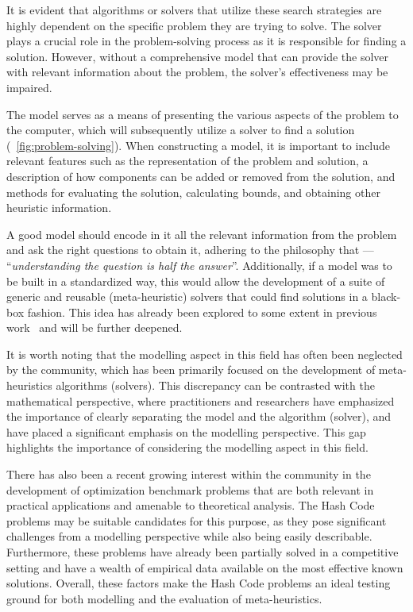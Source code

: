 It is evident that algorithms or solvers that utilize these search strategies
are highly dependent on the specific problem they are trying to solve.  The
solver plays a crucial role in the problem-solving process as it is responsible
for finding a solution. However, without a comprehensive model that can provide
the solver with relevant information about the problem, the solver's
effectiveness may be impaired.

The model serves as a means of presenting the various aspects of the problem to
the computer, which will subsequently utilize a solver to find a
solution (~\ref{fig:problem-solving}).  When constructing a model, it is important
to include relevant features such as the representation of the problem and
solution, a description of how components can be added or removed from the
solution, and methods for evaluating the solution, calculating bounds, and
obtaining other heuristic information.

A good model should encode in it all the relevant information from the problem
and ask the right questions to obtain it, adhering to the philosophy that ---
``\textit{understanding the question is half the answer}''. Additionally, if a
model was to be built in a standardized way, this would allow the development of
a suite of generic and reusable (meta-heuristic) solvers that could find
solutions in a black-box fashion. This idea has already been explored to some
extent in previous work~\cite{outeiro2021application,vieira2009uma} and will be
further deepened.

It is worth noting that the modelling aspect in this field has often been
neglected by the community, which has been primarily focused on the development
of meta-heuristics algorithms (solvers). This discrepancy can be contrasted with
the mathematical perspective, where practitioners and researchers have
emphasized the importance of clearly separating the model and the algorithm
(solver), and have placed a significant emphasis on the modelling perspective.
This gap highlights the importance of considering the modelling aspect in this
field.

There has also been a recent growing interest within the community in the
development of optimization benchmark problems that are both relevant in
practical applications and amenable to theoretical analysis. The Hash Code
problems may be suitable candidates for this purpose, as they pose significant
challenges from a modelling perspective while also being easily describable.
Furthermore, these problems have already been partially solved in a competitive
setting and have a wealth of empirical data available on the most effective
known solutions.  Overall, these factors make the Hash Code problems an ideal
testing ground for both modelling and the evaluation of meta-heuristics.

